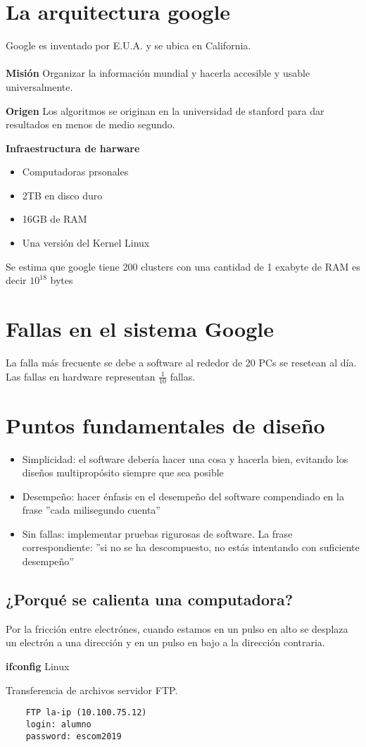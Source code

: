 \section{La arquitectura google}
Google es inventado por E.U.A. y se ubica en California.\\\\

\textbf{Misión}
Organizar la información mundial y hacerla accesible y usable universalmente.

\textbf{Origen}
Los algoritmos se originan en la universidad de stanford para dar resultados en menos de medio segundo.

\textbf{Infraestructura de harware}
\begin{itemize}
    \item {Computadoras prsonales}
    \item {2TB en disco duro}
    \item {16GB de RAM}
    \item {Una versión del Kernel Linux}
\end{itemize}

Se estima que google tiene 200 clusters con una cantidad de 1 exabyte de RAM es decir $10^{18}$ bytes

\section{Fallas en el sistema Google}
La falla más frecuente se debe a software al rededor de 20 PCs se resetean al día. Las fallas en hardware representan $\frac{1}{10}$ fallas.

\section{Puntos fundamentales de diseño}
\begin{itemize}
    \item {Simplicidad: el software debería hacer una cosa y hacerla bien, evitando los diseños multipropósito siempre que sea posible}
    \item {Desempeño: hacer énfasis en el desempeño del software compendiado en la frase ''cada milisegundo cuenta''}
    \item {Sin fallas: implementar pruebas rigurosas de software. La frase correspondiente: ''si no se ha descompuesto, no estás intentando con suficiente desempeño''}
\end{itemize}

\subsection{¿Porqué se calienta una computadora?}
Por la fricción entre electrónes, cuando estamos en un pulso en alto se desplaza un electrón a una dirección y en un pulso en bajo a la dirección contraria.

\textbf{ifconfig } Linux

Transferencia de archivos servidor FTP.
\begin{lstlisting}
    FTP la-ip (10.100.75.12)
    login: alumno
    password: escom2019
\end{lstlisting}

